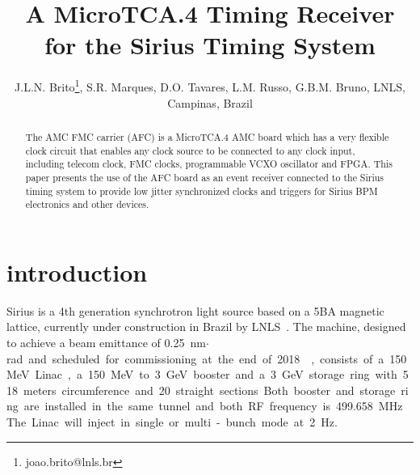 \documentclass[a4paper,
               biblatex,      %
               ]{jacow}
\begin{document}
\title{A MicroTCA.4  Timing Receiver for the Sirius Timing System}

\author{J.L.N. Brito\thanks{joao.brito@lnls.br}, S.R. Marques, D.O. Tavares, L.M. Russo, G.B.M. Bruno, LNLS, Campinas, Brazil}
	
\maketitle


\begin{abstract}
The AMC FMC carrier (AFC) is a MicroTCA.4 AMC board which has a very flexible clock circuit that enables any clock source to be connected to any clock input, including telecom clock, FMC clocks, programmable VCXO oscillator and FPGA. This paper presents the use of the AFC board as an event receiver connected to the Sirius timing system to provide low jitter synchronized clocks and triggers for Sirius BPM electronics and other devices.
\end{abstract}


\section{introduction}

Sirius is a 4th  generation  synchrotron light source  based  on  a 5BA magnetic lattice, currently under construction in Brazil by LNLS~\cite{sirius_ipac16}. The machine, designed to achieve a beam emittance of \SI{0.25}{nm$\cdot$rad} and scheduled for commissioning at the end of 2018~\cite{rodrigues2016sirius}, consists of a 150 MeV Linac, a 150 MeV to 3 GeV booster and a 3 GeV storage ring with 518 meters circumference and 20 straight sections. Both booster and storage ring are installed in the same tunnel and both RF frequency is \SI{499.658}{MHz}. The Linac will inject in single or multi-bunch mode at \SI{2}{Hz}.

\end{document}
